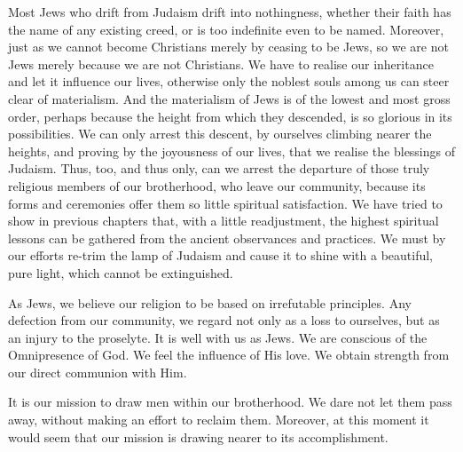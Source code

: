 Most Jews who drift from Judaism drift
into nothingness, whether their faith has
the name of any existing creed, or is too
indefinite even to be named. Moreover,
just as we cannot become Christians merely
by ceasing to be Jews, so we are not Jews
merely because we are not Christians. We
have to realise our inheritance and let it
influence our lives, otherwise only the noblest
souls among us can steer clear of materialism.
And the materialism of Jews is of the lowest
and most gross order, perhaps because the
height from which they descended, is so
glorious in its possibilities. We can only
arrest this descent, by ourselves climbing
nearer the heights, and proving by the
joyousness of our lives, that we realise the
blessings of Judaism. Thus, too, and thus
only, can we arrest the departure of those
truly religious members of our brotherhood,
who leave our community, because its forms
and ceremonies offer them so little spiritual
satisfaction. We have tried to show in
previous chapters that, with a little readjustment,
the highest spiritual lessons can be
gathered from the ancient observances and
practices. We must by our efforts re-trim the
lamp of Judaism and cause it to shine with
a beautiful, pure light, which cannot be
extinguished.

As Jews, we believe our religion to be
based on irrefutable principles. Any defection
from our community, we regard not only as a
loss to ourselves, but as an injury to the
proselyte. It is well with us as Jews. We
are conscious of the Omnipresence of God.
We feel the influence of His love. We
obtain strength from our direct communion
with Him.

It is our mission to draw men within our
brotherhood. We dare not let them pass
away, without making an effort to reclaim
them. Moreover, at this moment it would
seem that our mission is drawing nearer to
its accomplishment.


